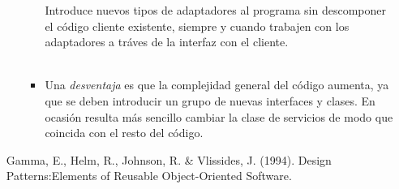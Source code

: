\documentclass[a4paper,10pt]{article}
\begin{document}
\begin{enumerate}
\begin{enumerate}
\begin{itemize}
                      Introduce nuevos tipos de adaptadores al programa sin descomponer el código cliente existente, siempre y cuando trabajen con los
                      adaptadores a tráves de la interfaz con el cliente.\\\\  
                     
                \item  Una \textit{desventaja} es que la complejidad general del código aumenta, ya que se deben introducir un grupo de nuevas interfaces y clases.
                      En ocasión resulta más sencillo cambiar la clase de servicios de modo que coincida con el resto del código.         
            \end{itemize}              
        \end{enumerate}

        \begin{thebibliography}{0}
             Gamma, E., Helm, R., Johnson, R. & Vlissides, J. (1994). Design Patterns:Elements of Reusable Object-Oriented Software.                           
          \end{thebibliography}
        
       
        
                 

\end{enumerate}
\end{document}
